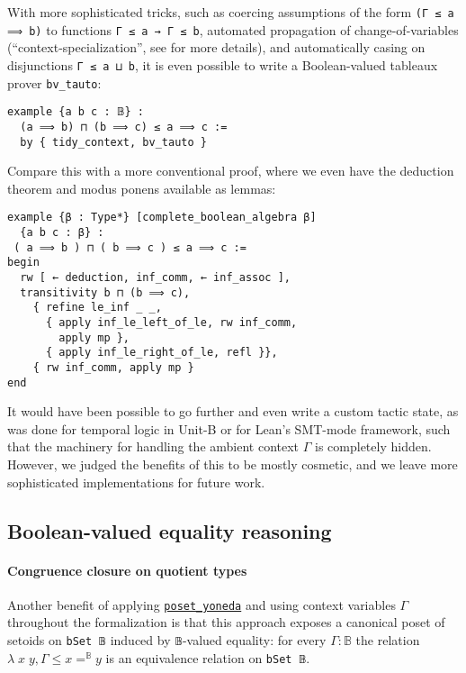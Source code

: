 \documentclass[sigplan,10pt,review]{acmart}
\newcommand{\B}{\mathbb{B}}
\newcommand{\lil}{\lstinline}
\theoremstyle{definition}
\begin{document}
With more sophisticated tricks, such as coercing assumptions of the form \lil{(Γ ≤ a ⟹ b)} to functions \lil{Γ ≤ a → Γ ≤ b}, automated propagation of change-of-variables (``context-specialization'', see \cite{DBLP:conf/itp/HanD19} for more details), and automatically casing on disjunctions \lil{Γ ≤ a ⊔ b}, it is even possible to write a Boolean-valued tableaux prover \lil{bv_tauto}:
\begin{lstlisting}
example {a b c : 𝔹} :
  (a ⟹ b) ⊓ (b ⟹ c) ≤ a ⟹ c :=
  by { tidy_context, bv_tauto }
\end{lstlisting}
Compare this with a more conventional proof, where we even have the deduction theorem and modus ponens available as lemmas: %
\begin{lstlisting}
example {β : Type*} [complete_boolean_algebra β]
  {a b c : β} :
 ( a ⟹ b ) ⊓ ( b ⟹ c ) ≤ a ⟹ c :=
begin
  rw [ ← deduction, inf_comm, ← inf_assoc ],
  transitivity b ⊓ (b ⟹ c),
    { refine le_inf _ _,
      { apply inf_le_left_of_le, rw inf_comm,
        apply mp },
      { apply inf_le_right_of_le, refl }},
    { rw inf_comm, apply mp }
end
\end{lstlisting}

It would have been possible to go further and even write a custom tactic state,
as was done for temporal logic in Unit-B \cite{Hudon2015TheUM} or for Lean's SMT-mode framework,
such that the machinery for handling the ambient context \(\Gamma\) is completely hidden. %
However, we judged the benefits of this to be mostly cosmetic, and we leave more sophisticated implementations for future work.

\subsection{Boolean-valued equality reasoning}

\paragraph{Congruence closure on quotient types} \label{subsect:bv-cc}
Another benefit of applying \hyperref[poset-yoneda]{\lstinline{poset_yoneda}} and using context variables \(\Gamma\) throughout the formalization is that this approach exposes a canonical poset of setoids on \lil{bSet 𝔹} induced by \lil{𝔹}-valued equality:
for every \(\Gamma : \mathbb{B}\) the relation \(\lambda\; x \; y, \Gamma \leq x =^{\mathbb{B}} y\) is an equivalence relation on \lil{bSet 𝔹}. %
\end{document}
